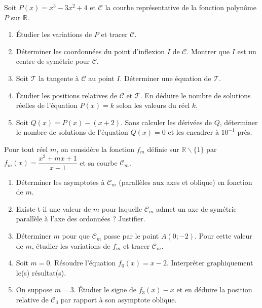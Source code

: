 \documentclass[11pt]{article}
\def\setminus{\mathbin{\backslash}}\let\smallsetminus\setminus
\begin{document}
\begin{exercice}
Soit $P(x)=x^3-3x^2+4$ et $\mathcal{C}$ la courbe représentative de la fonction polynôme $P$ sur $\mathbb{R}$.
\begin{enumerate}
    \item Étudier les variations de $P$ et tracer $\mathcal{C}$.
    \item Déterminer les coordonnées du point d'inflexion $I$ de $\mathcal{C}$. Montrer que $I$ est un centre de symétrie pour $\mathcal{C}$.
    \item Soit $\mathcal{T}$ la tangente à $\mathcal{C}$ au point $I$. Déterminer une équation de $\mathcal{T}$.
    \item Étudier les positions relatives de $\mathcal{C}$ et $\mathcal{T}$. En déduire le nombre de solutions réelles de l'équation $P(x)=k$ selon les valeurs du réel $k$.
    \item Soit $Q(x)=P(x)-(x+2)$. Sans calculer les dérivées de $Q$, déterminer le nombre de solutions de l'équation $Q(x)=0$ et les encadrer à $10^{-1}$ près.
\end{enumerate}
\end{exercice}

\begin{exercice}
Pour tout réel $m$, on considère la fonction $f_m$ définie sur $\mathbb{R}\setminus\{1\}$ par $f_m(x)=\dfrac{x^2+mx+1}{x-1}$ et sa courbe $\mathcal{C}_m$.
\begin{enumerate}
    \item Déterminer les asymptotes à $\mathcal{C}_m$ (parallèles aux axes et oblique) en fonction de $m$.
    \item Existe-t-il une valeur de $m$ pour laquelle $\mathcal{C}_m$ admet un axe de symétrie parallèle à l'axe des ordonnées ? Justifier.
    \item Déterminer $m$ pour que $\mathcal{C}_m$ passe par le point $A(0;-2)$. Pour cette valeur de $m$, étudier les variations de $f_m$ et tracer $\mathcal{C}_m$.
    \item Soit $m=0$. Résoudre l'équation $f_0(x)=x-2$. Interpréter graphiquement le(s) résultat(s).
    \item On suppose $m=3$. Étudier le signe de $f_3(x)-x$ et en déduire la position relative de $\mathcal{C}_3$ par rapport à son asymptote oblique.
\end{enumerate}
\end{exercice}
\end{document}
